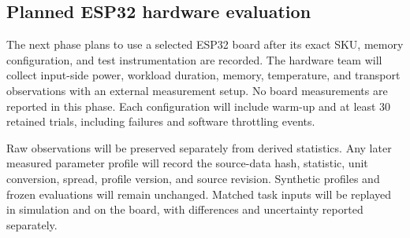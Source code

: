 \subsection{Planned ESP32 hardware evaluation}
The next phase plans to use a selected ESP32 board after its exact SKU, memory configuration, and test
instrumentation are recorded. The hardware team will collect input-side power, workload duration, memory,
temperature, and transport observations with an external measurement setup. No board measurements are
reported in this phase. Each configuration will include warm-up and at least 30 retained trials, including
failures and software throttling events.

Raw observations will be preserved separately from derived statistics. Any later measured parameter
profile will record the source-data hash, statistic, unit conversion, spread, profile version, and source
revision. Synthetic profiles and frozen evaluations will remain unchanged. Matched task inputs will be
replayed in simulation and on the board, with differences and uncertainty reported separately.
